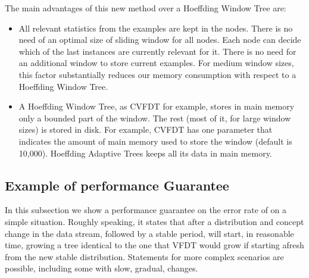 The main advantages of this new method over a Hoeffding Window Tree are:
\begin{itemize}
\item All relevant statistics from the examples are kept in the nodes. 
There is no need of an optimal size of sliding window for all nodes. Each node
can decide which of the last instances are currently relevant for it.
There is no need for an additional window to store current examples.
For medium window sizes, this factor substantially reduces our memory
consumption with respect to a Hoeffding Window Tree.

\item  A Hoeffding Window Tree, as CVFDT for example, stores in main memory only a bounded part of the window. The 
rest (most of it, for large window sizes) is stored in disk. 
For example, CVFDT has one parameter that indicates the amount of main memory used to store the window
(default is 10,000).
Hoeffding Adaptive Trees keeps all its data in main memory. %

\end{itemize}

\subsection{Example of performance Guarantee}

In this subsection we show a performance guarantee on
the error rate of \HATAdwin on a simple situation. 
Roughly speaking, it states that after a distribution and concept change 
in the data stream, followed by a stable period, \HATAdwin will start,
in reasonable time, growing a tree identical to the one that 
VFDT would grow if starting afresh from the new stable distribution. 
Statements for more complex scenarios are possible, 
including some with slow, gradual, changes.%

